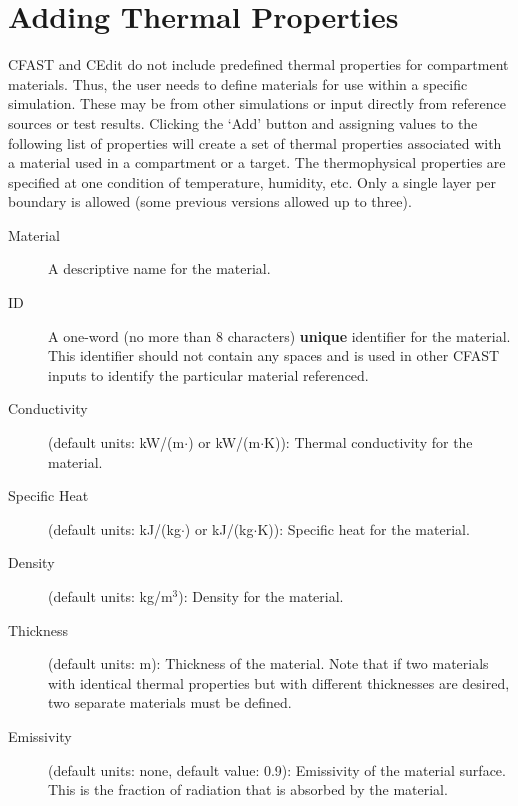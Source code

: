 \section{Adding Thermal Properties}
\label{info:MATL}

CFAST and CEdit do not include predefined thermal properties for compartment materials. Thus, the user needs to define materials for use within a specific simulation. These may be from other simulations or input directly from reference sources or test results. Clicking the `Add' button and assigning values to the following list of properties will create a set of thermal properties associated with a material used in a compartment or a target. The thermophysical properties are specified at one condition of temperature, humidity, etc.  Only a single layer per boundary is allowed (some previous versions allowed up to three).

\begin{description}
\item[Material] A descriptive name for the material.

\item[ID] A one-word (no more than 8 characters) \textbf{unique} identifier for the material.  This identifier should not contain any spaces and is used in other CFAST inputs to identify the particular material referenced.

\item[Conductivity] (default units: kW/(m$\cdot$\degc)  or  kW/(m$\cdot$K)): Thermal conductivity for the material.

\item[Specific Heat] (default units: kJ/(kg$\cdot$\degc) or kJ/(kg$\cdot$K)): Specific heat for the material.

\item[Density] (default units: kg/m$^3$): Density for the material.

\item[Thickness] (default units: m): Thickness of the material.  Note that if two materials with identical thermal properties but with different thicknesses are desired, two separate materials must be defined.

\item[Emissivity] (default units: none, default value: 0.9): Emissivity of the material surface.  This is the fraction of radiation that is absorbed by the material.
\end{description}





